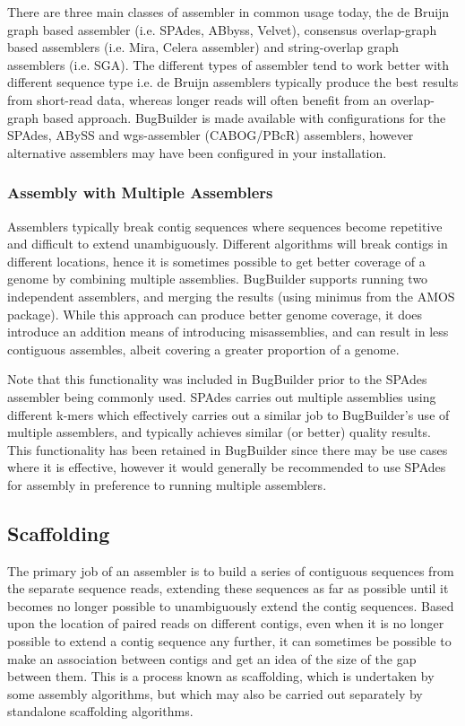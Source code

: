\documentclass[a4paper,10pt]{article}
\begin{document}
There are three main classes of assembler in common usage today, the de Bruijn
graph based assembler (i.e. SPAdes, ABbyss, Velvet), consensus overlap-graph
based assemblers (i.e. Mira, Celera assembler) and string-overlap graph
assemblers (i.e. SGA). The different types of assembler tend to work better
with different sequence type i.e. de Bruijn assemblers typically produce the
best results from short-read data, whereas longer reads will often benefit from
an overlap-graph based approach.  BugBuilder is made available with
configurations for the SPAdes, ABySS and wgs-assembler (CABOG/PBcR) assemblers,
however alternative assemblers may have been configured in your installation.

\subsubsection{Assembly with Multiple Assemblers}
\label{subsec:multiassem}

Assemblers typically break contig sequences where sequences become repetitive
and difficult to extend unambiguously. Different algorithms will break contigs
in different locations, hence it is sometimes possible to get better coverage
of a genome by combining multiple assemblies. BugBuilder supports running two
independent assemblers, and merging the results (using minimus from the AMOS
package). While this approach can produce better genome coverage, it does
introduce an addition means of introducing misassemblies, and can result in
less contiguous assembles, albeit covering a greater proportion of a genome. 

Note that this functionality was included in BugBuilder
prior to the SPAdes assembler being commonly used. SPAdes carries out multiple
assemblies using different k-mers which effectively carries out a similar job
to BugBuilder's use of multiple assemblers, and typically achieves similar (or
better) quality results. This functionality has been retained in BugBuilder
since there may be use cases where it is effective, however it would generally
be recommended to use SPAdes for assembly in preference to running multiple
assemblers.


\subsection{Scaffolding}

The primary job of an assembler is to build a series of contiguous sequences
from the separate sequence reads, extending these sequences as far as possible
until it becomes no longer possible to unambiguously extend the contig
sequences. Based upon the location of paired reads on different contigs, even
when it is no longer possible to extend a contig sequence any further, it can
sometimes be possible to make an association between  contigs and get an idea
of the size of the gap between them. This is a process known as scaffolding,
which is undertaken by some assembly algorithms, but which may also be carried
out separately by standalone scaffolding algorithms.
\end{document}
